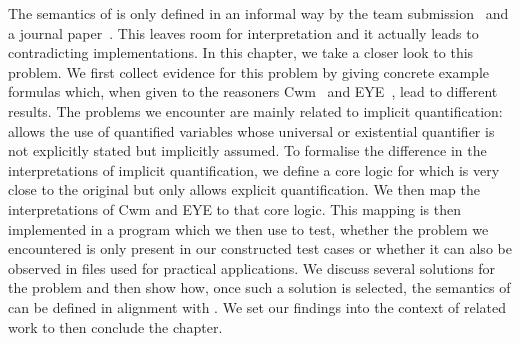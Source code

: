 









The semantics of \nthreelogic is only defined in an informal way by the \wwwc team submission~\cite{Notation3} and a journal paper~\cite{N3Logic}. 
This leaves room for interpretation and it actually leads to contradicting implementations. 
In this chapter, we take a closer look to this problem. %
We first collect evidence for this problem by giving concrete example formulas which, when given to the reasoners Cwm~\cite{cwm} and EYE~\cite{eye}, lead to different results. The problems we encounter are mainly related to 
implicit quantification: \nthree allows the use of quantified variables whose universal or existential quantifier is not explicitly stated but implicitly assumed.
To formalise the difference in the interpretations of implicit quantification, we define a core logic for \nthree which is very close to the original but only allows explicit quantification. We then map the interpretations of Cwm and EYE to that core logic.
This mapping is then implemented in a program which we then use to test, whether the problem we encountered is only present in our constructed test cases or whether it can also be observed in files 
used for practical applications.
We discuss several solutions for the problem and then show how, once such a solution is selected, the semantics of \nthreelogic can be defined in alignment with \rdf.
We set our findings into the context of related work to then conclude the chapter.


